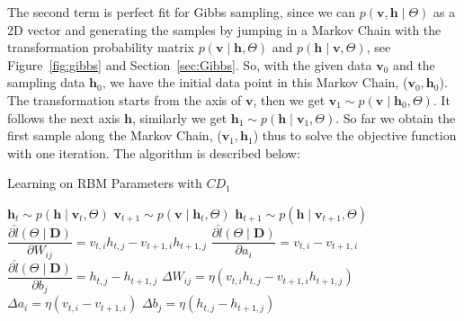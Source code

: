 	The second term is perfect fit for Gibbs sampling, since we can $ p(\mathbf{v}, \mathbf{h} \mid \Theta) $ as a 2D vector and generating the samples by jumping in a Markov Chain with the transformation probability matrix $ p(\mathbf{v} \mid \mathbf{h}, \Theta) $ and $ p(\mathbf{h} \mid \mathbf{v}, \Theta) $, see Figure~\ref{fig:gibbs} and Section~\ref{sec:Gibbs}.
	So, with the given data $ \mathbf{v}_0 $ and the sampling data $ \mathbf{h}_0 $, we have the initial data point in this Markov Chain,  ($ \mathbf{v}_0, \mathbf{h}_0$).
	The transformation starts from the axis of $ \mathbf{v} $, then we get $ \mathbf{v}_1 \sim p( \mathbf{v} \mid \mathbf{h}_0, \Theta) $.
	It follows the next axis $ \mathbf{h} $, similarly we get $ \mathbf{h}_1 \sim p( \mathbf{h} \mid \mathbf{v}_1, \Theta) $.
	So far we obtain the first sample along the Markov Chain, ($ \mathbf{v}_1, \mathbf{h}_1$) thus to solve the objective function with one iteration.
	The algorithm is described below:   
	\begin{algorithm}[h]
		\caption{Learning on RBM Parameters with $ CD_1 $}
		\label{alg:learn}
		\begin{algorithmic}
			 
			\State $ \mathbf{h}_t \sim p( \mathbf{h} \mid \mathbf{v}_t, \Theta) $
			\State $ \mathbf{v}_{t+1} \sim p( \mathbf{v} \mid \mathbf{h}_{t}, \Theta) $
			\State $ \mathbf{h}_{t+1} \sim p( \mathbf{h} \mid \mathbf{v}_{t+1}, \Theta) $
			\State $ \dfrac{\partial \hat{l} (\Theta \mid \mathbf{D})}{\partial W_{ij}} = v_{t,i} h_{t,j} - v_{t+1,i} h_{t+1,j}$
			\State $ \dfrac{\partial \hat{l} (\Theta \mid \mathbf{D})}{\partial a_{i}} = v_{t,i} - v_{t+1,i} $
			\State $  \dfrac{\partial \hat{l} (\Theta \mid \mathbf{D})}{\partial b_{j}} = h_{t,j} - h_{t+1,j}$
			\State $ \Delta W_{ij} = \eta ( v_{t,i} h_{t,j} - v_{t+1,i} h_{t+1,j}) $
			\State $ \Delta a_{i} = \eta ( v_{t,i} - v_{t+1,i}) $
			\State $ \Delta b_{j} = \eta ( h_{t,j} - h_{t+1,j}) $
			\EndFor
		\end{algorithmic}
	\end{algorithm}
